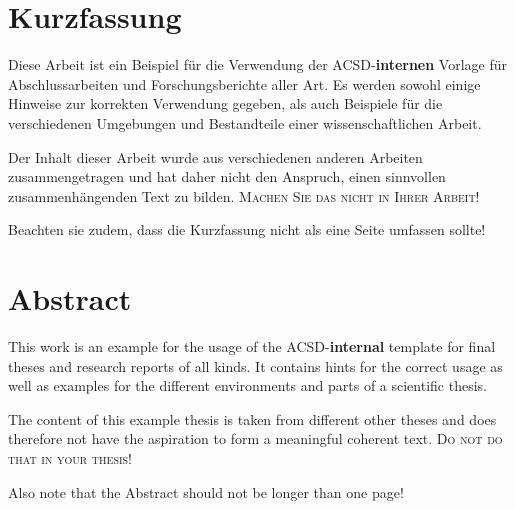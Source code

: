 \setcounter{page}{1}
\chapter*{\bfseries Kurzfassung} %
\thispagestyle{empty}

Diese Arbeit ist ein Beispiel für die Verwendung der ACSD-\textbf{internen} Vorlage für Abschlussarbeiten und Forschungsberichte aller Art. Es werden sowohl einige Hinweise zur korrekten Verwendung gegeben, als auch Beispiele f{\"u}r die verschiedenen Umgebungen und Bestandteile einer wissenschaftlichen Arbeit.

Der Inhalt dieser Arbeit wurde aus verschiedenen anderen Arbeiten zusammengetragen und hat daher nicht den Anspruch, einen sinnvollen zusammenh{\"a}ngenden Text zu bilden. \textsc{Machen Sie das nicht in Ihrer Arbeit!}

Beachten sie zudem, dass die Kurzfassung nicht als eine Seite umfassen sollte!

\cleardoublepage

\chapter*{\bfseries Abstract} %
\thispagestyle{empty}

This work is an example for the usage of the ACSD-\textbf{internal} template for final theses and research reports of all kinds. It contains hints for the correct usage as well as examples for the different environments and parts of a scientific thesis. 

The content of this example thesis is taken from different other theses and does therefore not have the aspiration to form a meaningful coherent text. \textsc{Do not do that in your thesis!}

Also note that the Abstract should not be longer than one page!

\cleardoublepage